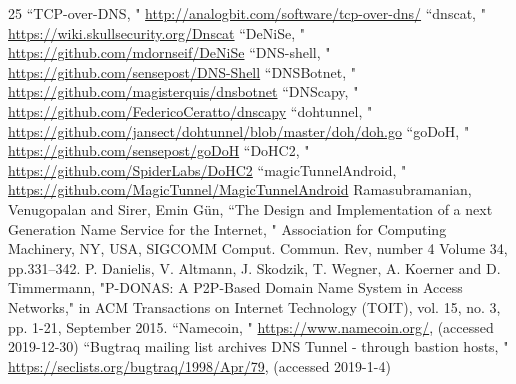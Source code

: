 \documentclass[12pt]{jarticle} %
\begin{document}
\begin{thebibliography} {25}
  ``TCP-over-DNS, " \href{http://analogbit.com/software/tcp-over-dns/}{http://analogbit.com/software/tcp-over-dns/}
  ``dnscat, " \href{https://wiki.skullsecurity.org/Dnscat}{https://wiki.skullsecurity.org/Dnscat}
  ``DeNiSe, " \href{https://github.com/mdornseif/DeNiSe}{https://github.com/mdornseif/DeNiSe}
  ``DNS-shell, " \href{https://github.com/sensepost/DNS-Shell}{https://github.com/sensepost/DNS-Shell}
  ``DNSBotnet, " \href{https://github.com/magisterquis/dnsbotnet}{https://github.com/magisterquis/dnsbotnet}
  ``DNScapy, " \href{https://github.com/FedericoCeratto/dnscapy}{https://github.com/FedericoCeratto/dnscapy}
  ``dohtunnel, " \href{https://github.com/jansect/dohtunnel/blob/master/doh/doh.go}{https://github.com/jansect/dohtunnel/blob/master/doh/doh.go}
  ``goDoH, " \href{https://github.com/sensepost/goDoH}{https://github.com/sensepost/goDoH}
  ``DoHC2, " \href{https://github.com/SpiderLabs/DoHC2}{https://github.com/SpiderLabs/DoHC2}
  ``magicTunnelAndroid, " \href{https://github.com/MagicTunnel/MagicTunnelAndroid}{https://github.com/MagicTunnel/MagicTunnelAndroid}
  Ramasubramanian, Venugopalan and Sirer, Emin G\"{u}n, ``The Design and Implementation of a next Generation Name Service for the Internet, " Association for Computing Machinery, NY, USA, SIGCOMM Comput. Commun. Rev, number 4 Volume 34, pp.331–342.
  P. Danielis, V. Altmann, J. Skodzik, T. Wegner, A. Koerner and D. Timmermann, "P-DONAS: A P2P-Based Domain Name System in Access Networks," in ACM Transactions on Internet Technology (TOIT), vol. 15, no. 3, pp. 1-21, September 2015.
  ``Namecoin, " \href{https://www.namecoin.org/}{https://www.namecoin.org/}, (accessed 2019-12-30)
  ``Bugtraq mailing list archives DNS Tunnel - through bastion hosts, " \href{https://seclists.org/bugtraq/1998/Apr/79}{https://seclists.org/bugtraq/1998/Apr/79}, (accessed 2019-1-4)
\end{thebibliography}





\appendix
\end{document}
